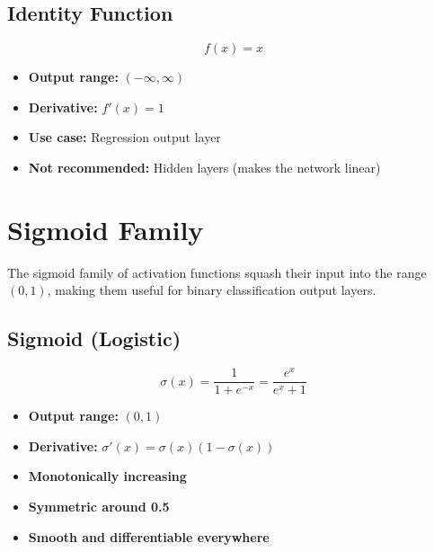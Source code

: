 \subsection{Identity Function}

\begin{equation}
f(x) = x
\end{equation}

\begin{itemize}
    \item \textbf{Output range:} $(-\infty, \infty)$
    \item \textbf{Derivative:} $f'(x) = 1$
    \item \textbf{Use case:} Regression output layer
    \item \textbf{Not recommended:} Hidden layers (makes the network linear)
\end{itemize}

\section{Sigmoid Family}

The sigmoid family of activation functions squash their input into the range $(0, 1)$, making them useful for binary classification output layers.

\subsection{Sigmoid (Logistic)}

\begin{equation}
\sigma(x) = \frac{1}{1 + e^{-x}} = \frac{e^x}{e^x + 1}
\end{equation}

\begin{properties}
\begin{itemize}
    \item \textbf{Output range:} $(0, 1)$
    \item \textbf{Derivative:} $\sigma'(x) = \sigma(x)(1 - \sigma(x))$
    \item \textbf{Monotonically increasing}
    \item \textbf{Symmetric around 0.5}
    \item \textbf{Smooth and differentiable everywhere}
\end{itemize}
\end{properties}

